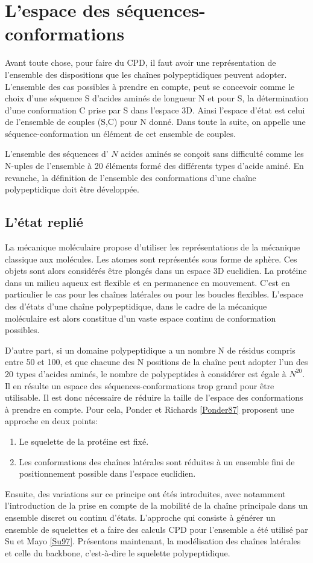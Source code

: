 \section{L'espace des séquences-conformations}
Avant toute chose, pour faire du CPD, il faut avoir une représentation de l'ensemble des dispositions que les chaînes polypeptidiques peuvent adopter. L'ensemble des cas possibles à prendre en compte, peut se concevoir comme le choix d'une séquence S d'acides aminés de longueur N  et pour S, la détermination d'une conformation C prise par S dans l'espace 3D. Ainsi l'espace d'état est celui de l'ensemble de couples (S,C) pour N donné. Dans toute la suite, on appelle une séquence-conformation un élément de cet ensemble de couples.   

L'ensemble des séquences d’ $N$ acides aminés se conçoit sans difficulté comme les N-uples de l'ensemble à 20 éléments formé des différents types d'acide aminé. En revanche, la définition de l'ensemble des conformations d'une chaîne polypeptidique doit être développée.

\subsection{L'état replié }
La mécanique moléculaire propose d'utiliser les représentations de la mécanique classique aux molécules. Les atomes sont représentés sous forme de sphère. Ces objets sont alors considérés être plongés dans un espace 3D euclidien.
La protéine dans un milieu aqueux est flexible et en permanence en mouvement. C'est en particulier le cas pour les chaînes latérales ou pour les boucles flexibles. L'espace des d'états d'une chaîne polypeptidique, dans le cadre de la mécanique moléculaire est alors constitue d'un vaste espace continu de conformation possibles.

D'autre part, si un domaine polypeptidique a un nombre N de résidus compris entre 50 et 100, et que chacune des N positions de la chaîne peut adopter l'un des 20 types d'acides aminés, le nombre de polypeptides à considérer est égale à  $N^{20}$. Il en résulte un espace des séquences-conformations trop grand pour être utilisable. Il est donc nécessaire de réduire la taille de l'espace des conformations à prendre en compte. Pour cela, Ponder et Richards \ref{Ponder87} proposent une approche en deux points:
\begin{enumerate}
\item Le squelette de la protéine est fixé.
\item Les conformations des chaînes latérales sont réduites à un ensemble fini de positionnement possible dans l'espace euclidien.
\end{enumerate}  
Ensuite, des variations sur ce principe ont étés introduites, avec notamment l'introduction de la prise en compte de la mobilité de la chaîne principale dans un ensemble discret ou continu d'états. L'approche qui consiste à générer un ensemble de squelettes et a faire des calculs CPD pour l'ensemble a été utilisé par Su et Mayo \ref{Su97}. 
Présentons maintenant, la modélisation des chaînes latérales et celle du backbone, c'est-à-dire le squelette polypeptidique.

